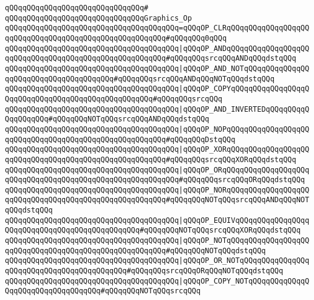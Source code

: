 \verb|qQQqqQQqqQQqqQQqqQQqqQQqqQQqqQQq#|\newline
\verb|qQQqqQQqqQQqqQQqqQQqqQQqqQQqqQQqGraphics_Op|\newline
\verb|qQQqqQQqqQQqqQQqqQQqqQQqqQQqqQQqqQQqqQQq=qQQqOP_CLRqQQqqQQqqQQqqQQqqQQqqQQqqQQqqQQqqQQqqQQqqQQqqQQqqQQqqQQq#qQQqqQQq0qQQq|\newline
\verb|qQQqqQQqqQQqqQQqqQQqqQQqqQQqqQQqqQQqqQQq|\verb#|qQQqOP_ANDqQQqqQQqqQQqqQQqqQQqqQQqqQQqqQQqqQQqqQQqqQQqqQQqqQQqqQQq#\verb|#qQQqqQQqsrcqQQqANDqQQqdstqQQq|\newline
\verb|qQQqqQQqqQQqqQQqqQQqqQQqqQQqqQQqqQQqqQQq|\verb#|qQQqOP_AND_NOTqQQqqQQqqQQqqQQqqQQqqQQqqQQqqQQqqQQqqQQq#\verb|#qQQqqQQqsrcqQQqANDqQQqNOTqQQqdstqQQq|\newline
\verb|qQQqqQQqqQQqqQQqqQQqqQQqqQQqqQQqqQQqqQQq|\verb#|qQQqOP_COPYqQQqqQQqqQQqqQQqqQQqqQQqqQQqqQQqqQQqqQQqqQQqqQQqqQQq#\verb|#qQQqqQQqsrcqQQq|\newline
\verb|qQQqqQQqqQQqqQQqqQQqqQQqqQQqqQQqqQQqqQQq|\verb#|qQQqOP_AND_INVERTEDqQQqqQQqqQQqqQQqqQQq#\verb|#qQQqqQQqNOTqQQqsrcqQQqANDqQQqdstqQQq|\newline
\verb|qQQqqQQqqQQqqQQqqQQqqQQqqQQqqQQqqQQqqQQq|\verb#|qQQqOP_NOPqQQqqQQqqQQqqQQqqQQqqQQqqQQqqQQqqQQqqQQqqQQqqQQqqQQqqQQq#\verb|#qQQqqQQqDstqQQq|\newline
\verb|qQQqqQQqqQQqqQQqqQQqqQQqqQQqqQQqqQQqqQQq|\verb#|qQQqOP_XORqQQqqQQqqQQqqQQqqQQqqQQqqQQqqQQqqQQqqQQqqQQqqQQqqQQqqQQq#\verb|#qQQqqQQqsrcqQQqXORqQQqdstqQQq|\newline
\verb|qQQqqQQqqQQqqQQqqQQqqQQqqQQqqQQqqQQqqQQq|\verb#|qQQqOP_ORqQQqqQQqqQQqqQQqqQQqqQQqqQQqqQQqqQQqqQQqqQQqqQQqqQQqqQQqqQQq#\verb|#qQQqqQQqsrcqQQqORqQQqdstqQQq|\newline
\verb|qQQqqQQqqQQqqQQqqQQqqQQqqQQqqQQqqQQqqQQq|\verb#|qQQqOP_NORqQQqqQQqqQQqqQQqqQQqqQQqqQQqqQQqqQQqqQQqqQQqqQQqqQQqqQQq#\verb|#qQQqqQQqNOTqQQqsrcqQQqANDqQQqNOTqQQqdstqQQq|\newline
\verb|qQQqqQQqqQQqqQQqqQQqqQQqqQQqqQQqqQQqqQQq|\verb#|qQQqOP_EQUIVqQQqqQQqqQQqqQQqqQQqqQQqqQQqqQQqqQQqqQQqqQQqqQQq#\verb|#qQQqqQQqNOTqQQqsrcqQQqXORqQQqdstqQQq|\newline
\verb|qQQqqQQqqQQqqQQqqQQqqQQqqQQqqQQqqQQqqQQq|\verb#|qQQqOP_NOTqQQqqQQqqQQqqQQqqQQqqQQqqQQqqQQqqQQqqQQqqQQqqQQqqQQqqQQq#\verb|#qQQqqQQqNOTqQQqdstqQQq|\newline
\verb|qQQqqQQqqQQqqQQqqQQqqQQqqQQqqQQqqQQqqQQq|\verb#|qQQqOP_OR_NOTqQQqqQQqqQQqqQQqqQQqqQQqqQQqqQQqqQQqqQQqqQQq#\verb|#qQQqqQQqsrcqQQqORqQQqNOTqQQqdstqQQq|\newline
\verb|qQQqqQQqqQQqqQQqqQQqqQQqqQQqqQQqqQQqqQQq|\verb#|qQQqOP_COPY_NOTqQQqqQQqqQQqqQQqqQQqqQQqqQQqqQQqqQQq#\verb|#qQQqqQQqNOTqQQqsrcqQQq|\newline
